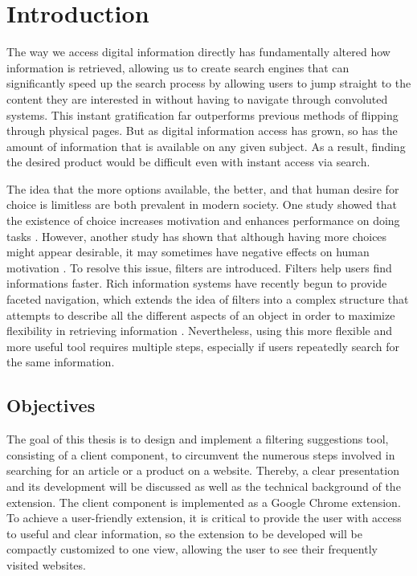 \newpage
\chapter{Introduction}
The way we access digital information directly has fundamentally altered how information is retrieved, allowing us to create search engines that can significantly speed up the search process by allowing users to jump straight to the content they are interested in without having to navigate through convoluted systems. This instant gratification far outperforms previous methods of flipping through physical pages. But as digital information access has grown, so has the amount of information that is available on any given subject. As a result, finding the desired product would be difficult even with instant access via search.

The idea that the more options available, the better, and that human desire for choice is limitless are both prevalent in modern society. One study showed that the existence of choice increases motivation and enhances performance on doing tasks \autocite{zuckerman1978importance}. However, another study has shown that although having more choices might appear desirable, it may sometimes have negative effects on human motivation \autocite{iyengar2000choice}. To resolve this issue, filters are introduced. Filters help users find informations faster. Rich information systems have recently begun to provide faceted navigation, which extends the idea of filters into a complex structure that attempts to describe all the different aspects of an object in order to maximize flexibility in retrieving information \autocite{whitenton2014filters}. Nevertheless, using this more flexible and more useful tool requires multiple steps, especially if users repeatedly search for the same information.

\section{Objectives}
The goal of this thesis is to design and implement a filtering suggestions tool, consisting of a client component, to circumvent the numerous steps involved in searching for an article or a product on a website. Thereby, a clear presentation and its development will be discussed as well as the technical background of the extension. The client component is implemented as a Google Chrome extension. To achieve a user-friendly extension, it is critical to provide the user with access to useful and clear information, so the extension to be developed will be compactly customized to one view, allowing the user to see their frequently visited websites.

